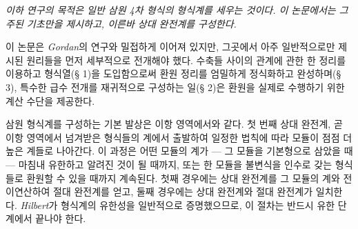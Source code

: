 
\emph{이하 연구의 목적은 일반 삼원 4차 형식의 형식계를 세우는 것이다. 이 논문에서는 그 주된 기초만을 제시하고, 이른바 \glqq{}상대 완전계\grqq{}}\emph{를 구성한다.}

이 논문은 \emph{Gordan}의 연구와 밀접하게 이어져 있지만, 그곳에서 아주 일반적으로만 제시된 원리들을 먼저 세부적으로 전개해야 했다. 수축들 사이의 관계에 관한 한 정리를 이용하고 \glqq{}형식열\grqq{}(§ 1)을 도입함으로써 환원 정리를 엄밀하게 정식화하고 완성하며(§ 3), 특수한 급수 전개를 재귀적으로 구성하는 일(§ 2)은 환원을 실제로 수행하기 위한 계산 수단을 제공한다.

삼원 형식계를 구성하는 기본 발상은 이항 영역에서와 같다. 첫 번째 상대 완전계, 곧 이항 영역에서 넘겨받은 형식들의 계에서 출발하여 일정한 법칙에 따라 모듈이 점점 더 높은 계들로 나아간다. 이 과정은 어떤 모듈의 계가 --- 그 모듈을 기본형으로 삼았을 때 --- 마침내 유한하고 알려진 것이 될 때까지, 또는 한 모듈을 불변식을 인수로 갖는 형식들로 환원할 수 있을 때까지 계속된다. 첫째 경우에는 상대 완전계를 그 모듈의 계와 전이연산하여 절대 완전계를 얻고, 둘째 경우에는 상대 완전계와 절대 완전계가 일치한다. \emph{Hilbert}가 형식계의 유한성을 일반적으로 증명했으므로, 이 절차는 반드시 유한 단계에서 끝나야 한다.

